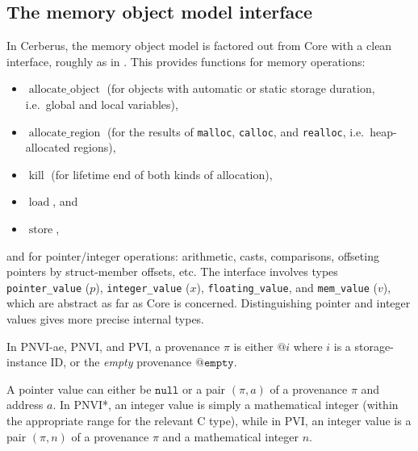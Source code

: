 \documentclass[acmsmall,review,screen]{acmart}\settopmatter{printfolios=true,printccs=false,printacmref=false}
\makeatletter
\DeclareMathOperator{\allocObject}{allocate\_object}
\DeclareMathOperator{\allocRegion}{allocate\_region}
\DeclareMathOperator{\Kill}{kill} %
\DeclareMathOperator{\load}{load}
\DeclareMathOperator{\store}{store}
\newcommand{\Null}{\mathtt{null}} %
\newcommand{\provNone}{@\mathtt{empty}}
\makeatother
\begin{document}
\subsection{The memory object model interface}
In Cerberus, the memory object model is factored out from Core with a clean 
interface, roughly as in .  
This provides 
functions for memory operations:
\begin{itemize}
\item $\allocObject$ %
(for objects with automatic or static
storage duration, i.e.~global and local variables),  
\item $\allocRegion$ %
(for the results of \lstinline{malloc}, \lstinline{calloc}, and
\lstinline{realloc}, i.e.~heap-allocated regions),  
\item $\Kill$ (for lifetime end of both kinds of allocation),
\item $\load$, and
\item $\store$,
\end{itemize}
and for pointer/integer operations:
arithmetic, casts, comparisons,
offseting pointers by struct-member offsets, etc.
The interface involves types 
\texttt{pointer\_value} ($p$),
\texttt{integer\_value} ($x$),
\texttt{floating\_value}, 
and \texttt{mem\_value} ($v$), which are abstract as far as Core is
concerned.  
%
Distinguishing pointer and integer values gives more precise internal
types. %


In PNVI-ae, PNVI, and PVI, a provenance $\pi$ is either
 $@i$ where $i$ is a storage-instance ID, or the \emph{empty}
  provenance $\provNone$. 
%

A pointer value can either be $\Null$ or a pair $(\pi, a)$
of a provenance $\pi$ and address $a$.
In PNVI*, an integer value is simply a mathematical integer (within the appropriate range for the relevant C type), while in PVI, an
integer value is a pair $(\pi, n)$ of a provenance $\pi$ and a mathematical integer
$n$. 
\end{document}
